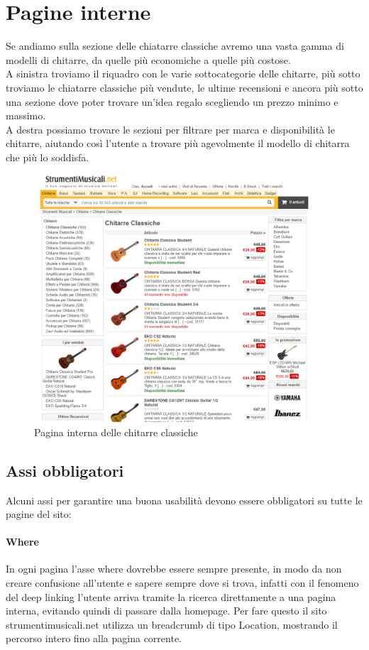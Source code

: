 \documentclass[12pt]{article}
\begin{document}
	\section{Pagine interne}
	Se andiamo sulla sezione delle chiatarre classiche avremo una vasta gamma di modelli di chitarre, da quelle più economiche a quelle più costose. \\ A sinistra troviamo il riquadro con le varie sottocategorie delle chitarre, più sotto troviamo le chiatarre classiche più vendute, le ultime recensioni e ancora più sotto una sezione dove poter trovare un'idea regalo scegliendo un prezzo minimo e massimo. \\ A destra possiamo trovare le sezioni per filtrare per marca e disponibilità le chitarre, aiutando così l'utente a trovare più agevolmente il modello di chitarra che più lo soddisfa.
	\begin{figure}[ht!]
		\centering	
		\includegraphics[width=145mm]{images/paginaInterna.png}
		\caption{Pagina interna delle chitarre classiche}
	\end{figure}
	\subsection{Assi obbligatori}
	\vspace{0.5cm}
	Alcuni assi per garantire una buona usabilità devono essere obbligatori su tutte le pagine del sito:
	\paragraph{Where} In ogni pagina l'asse where dovrebbe essere sempre presente, in modo da non creare confusione all'utente e sapere sempre dove si trova, infatti con il fenomeno del deep linking l'utente arriva tramite la ricerca direttamente a una pagina interna, evitando quindi di passare dalla homepage. Per fare questo il sito strumentimusicali.net utilizza un breadcrumb di tipo Location, mostrando il percorso intero fino alla pagina corrente. 
\end{document}
